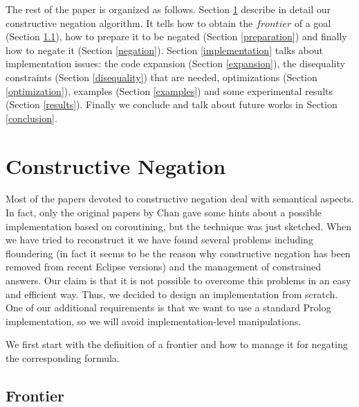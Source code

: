 \documentclass{llncs}
\begin{document}

The rest of the paper is organized as follows. Section
\ref{constructive} describe in detail our constructive negation
algorithm. It tells how to obtain the $frontier$ of a goal (Section
\ref{frontier}), how to prepare it to be negated (Section
\ref{preparation}) and finally how to negate it (Section
\ref{negation}). Section \ref{implementation} talks about
implementation issues: the code expansion (Section \ref{expansion}),
the disequality constraints (Section \ref{disequality}) that are
needed, optimizations (Section \ref{optimization}), examples (Section
\ref{examples}) and some experimental results (Section \ref{results}).
Finally we conclude and talk about future works in Section
\ref{conclusion}.
 


\section{Constructive Negation}
\label{constructive}

Most of the papers devoted to constructive negation deal 
with semantical aspects. In fact, only the original papers by Chan gave some hints
about a possible implementation based on coroutining, but the
technique was just sketched. When we have tried to reconstruct it we
have found several problems including floundering (in fact it seems to
be the reason why constructive negation has been removed from recent
Eclipse versions) and the management of constrained answers. 
Our claim is that it is not possible to overcome this problems in an easy
and efficient way.
Thus, we decided to design an implementation from
scratch.  One of our additional requirements is 
that we want to use a standard Prolog implementation, so we
will avoid implementation-level manipulations.

We first start with the definition of a frontier and how to manage it for
negating the corresponding formula.


\subsection{Frontier}
\label{frontier}
\end{document}

